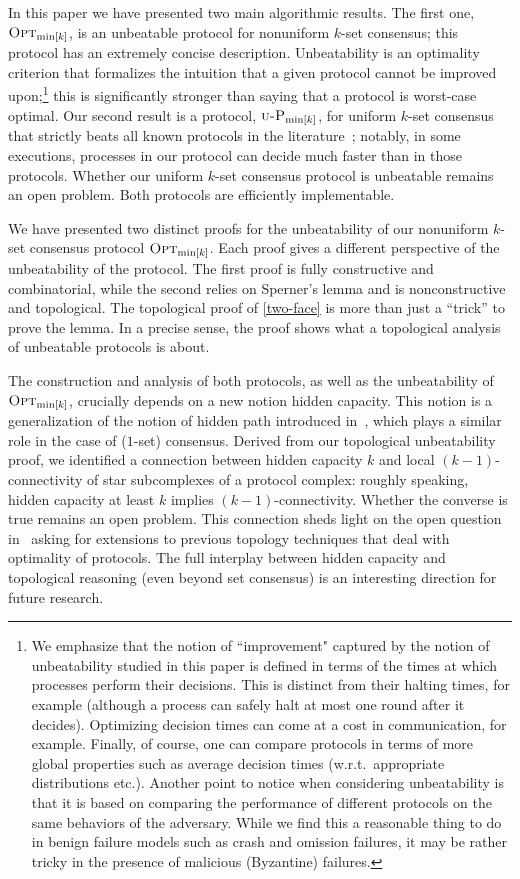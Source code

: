 \documentclass[11pt]{article}
\theoremstyle{definition}
\newcommand{\OptMink}{\mbox{$\mbox{\sc Opt}_{\min[k]}$}}
\newcommand{\UOptMink}{\mbox{$\mbox{\sc u-P}_{\min[k]}$}}
\begin{document}
In this paper we have presented two main algorithmic results. The first one, $\OptMink$, is an unbeatable protocol for nonuniform $k$-set
consensus; this protocol has an extremely concise description.
Unbeatability \cite{HalMoWa2001,AYY-DISC} is an optimality criterion that formalizes the intuition that a given protocol cannot be improved upon;\footnote{We emphasize that the notion of ``improvement" captured by the notion of unbeatability studied in this paper is defined in terms of the times at which processes perform their decisions. This is distinct from their halting times, for example (although a process can safely halt at most one round after it decides). Optimizing decision times can come at a cost in communication, for example. Finally, of course, one can compare protocols in terms of more global properties such as average decision times (w.r.t.~appropriate distributions etc.). Another point to notice when considering unbeatability is that it is based on comparing the performance of different protocols on the same behaviors of the adversary. While we find this a reasonable thing to do in benign failure models such as crash and omission failures, it may be rather tricky in the presence of malicious (Byzantine) failures.
}
 this is significantly stronger than saying that a protocol is worst-case optimal.
Our second result is a protocol, $\UOptMink$, for uniform $k$-set consensus that strictly
beats
all known
protocols in the literature~\cite{CHLT,GGP,GP09,RRT};
notably,
in some executions, processes in our protocol can decide
much faster than in those protocols.
Whether our uniform $k$-set consensus protocol is unbeatable remains an open problem.
Both protocols are
efficiently implementable.

We have presented two distinct
proofs for
the unbeatability of our
nonuniform $k$-set consensus
protocol $\OptMink$.
Each proof gives a different perspective
of the unbeatability of the protocol.
The first proof is fully constructive and combinatorial, while the second relies on Sperner's lemma and is nonconstructive and topological.
The topological proof of \cref{two-face} is more than just a ``trick''
to prove the lemma.
In a precise sense,
the proof shows what a topological
analysis of unbeatable protocols is about.

The construction and analysis of both protocols, as well as the unbeatability of $\OptMink$, crucially depends on a new notion hidden capacity.
This notion
is a generalization of the notion of hidden path
introduced in~\cite{AYY-DISC},
which plays a similar role in the case of ($1$-set) consensus.
Derived from our topological unbeatability proof, we identified a connection between hidden capacity $k$ and
local $(k-1)$-connectivity of star subcomplexes of a protocol complex: roughly speaking, hidden capacity at least $k$ implies $(k-1)$-connectivity.
Whether the converse is true remains an open problem.
This connection sheds light on the open question in~\cite{GP09}
asking for extensions to previous topology techniques that deal with
optimality of protocols.
The full interplay between hidden capacity and topological reasoning (even beyond set consensus) is an interesting direction for future research.
\end{document}
